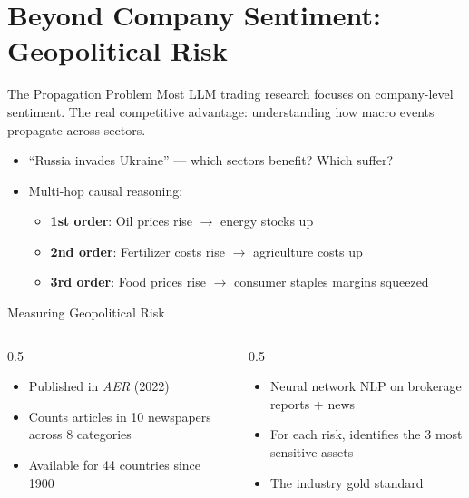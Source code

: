 \documentclass[aspectratio=169]{beamer}
\begin{document}
\section{Beyond Company Sentiment: Geopolitical Risk}

\begin{frame}{The Propagation Problem}
Most LLM trading research focuses on \alert{company-level} sentiment. The real competitive advantage: understanding how \alert{macro events propagate across sectors}.
\vspace{0.3cm}
\begin{itemize}
  \item ``Russia invades Ukraine'' --- which sectors benefit? Which suffer?
  \item Multi-hop causal reasoning:
  \begin{itemize}
    \item \textbf{1st order}: Oil prices rise $\rightarrow$ energy stocks up
    \item \textbf{2nd order}: Fertilizer costs rise $\rightarrow$ agriculture costs up
    \item \textbf{3rd order}: Food prices rise $\rightarrow$ consumer staples margins squeezed
  \end{itemize}
\end{itemize}
\end{frame}

\begin{frame}{Measuring Geopolitical Risk}
\begin{columns}[T]
\begin{column}{0.5\textwidth}
\begin{shadedbox}[title=\textbf{Caldara-Iacoviello GPR Index}]
\begin{itemize}\footnotesize
  \item Published in \textit{AER} (2022)
  \item Counts articles in 10 newspapers across 8 categories
  \item Available for 44 countries since 1900
\end{itemize}
\end{shadedbox}
\end{column}
\begin{column}{0.5\textwidth}
\begin{shadedbox}[title=\textbf{BlackRock BGRI}]
\begin{itemize}\footnotesize
  \item Neural network NLP on brokerage reports + news
  \item For each risk, identifies the \alert{3 most sensitive assets}
  \item The industry gold standard
\end{itemize}
\end{shadedbox}
\end{column}
\end{columns}
\end{frame}
\end{document}
